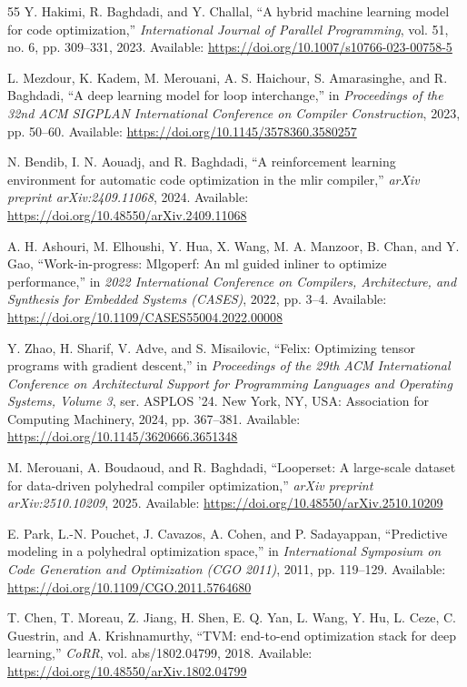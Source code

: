 \documentclass[10pt,twocolumn]{article}
\begin{document}
\begin{thebibliography}{55}
 Y. Hakimi, R. Baghdadi, and Y. Challal, ``A hybrid machine learning model for code optimization,'' \emph{International Journal of Parallel Programming}, vol. 51, no. 6, pp. 309--331, 2023. Available: \url{https://doi.org/10.1007/s10766-023-00758-5}

 L. Mezdour, K. Kadem, M. Merouani, A. S. Haichour, S. Amarasinghe, and R. Baghdadi, ``A deep learning model for loop interchange,'' in \emph{Proceedings of the 32nd ACM SIGPLAN International Conference on Compiler Construction}, 2023, pp. 50--60. Available: \url{https://doi.org/10.1145/3578360.3580257}

 N. Bendib, I. N. Aouadj, and R. Baghdadi, ``A reinforcement learning environment for automatic code optimization in the mlir compiler,'' \emph{arXiv preprint arXiv:2409.11068}, 2024. Available: \url{https://doi.org/10.48550/arXiv.2409.11068}

 A. H. Ashouri, M. Elhoushi, Y. Hua, X. Wang, M. A. Manzoor, B. Chan, and Y. Gao, ``Work-in-progress: Mlgoperf: An ml guided inliner to optimize performance,'' in \emph{2022 International Conference on Compilers, Architecture, and Synthesis for Embedded Systems (CASES)}, 2022, pp. 3--4. Available: \url{https://doi.org/10.1109/CASES55004.2022.00008}

 Y. Zhao, H. Sharif, V. Adve, and S. Misailovic, ``Felix: Optimizing tensor programs with gradient descent,'' in \emph{Proceedings of the 29th ACM International Conference on Architectural Support for Programming Languages and Operating Systems, Volume 3}, ser. ASPLOS '24. New York, NY, USA: Association for Computing Machinery, 2024, pp. 367--381. Available: \url{https://doi.org/10.1145/3620666.3651348}

 M. Merouani, A. Boudaoud, and R. Baghdadi, ``Looperset: A large-scale dataset for data-driven polyhedral compiler optimization,'' \emph{arXiv preprint arXiv:2510.10209}, 2025. Available: \url{https://doi.org/10.48550/arXiv.2510.10209}

 E. Park, L.-N. Pouchet, J. Cavazos, A. Cohen, and P. Sadayappan, ``Predictive modeling in a polyhedral optimization space,'' in \emph{International Symposium on Code Generation and Optimization (CGO 2011)}, 2011, pp. 119--129. Available: \url{https://doi.org/10.1109/CGO.2011.5764680}

 T. Chen, T. Moreau, Z. Jiang, H. Shen, E. Q. Yan, L. Wang, Y. Hu, L. Ceze, C. Guestrin, and A. Krishnamurthy, ``TVM: end-to-end optimization stack for deep learning,'' \emph{CoRR}, vol. abs/1802.04799, 2018. Available: \url{https://doi.org/10.48550/arXiv.1802.04799}


\end{thebibliography}
\end{document}

